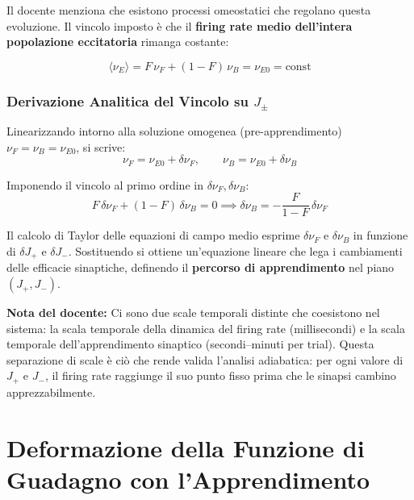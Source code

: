 Il docente menziona che esistono processi omeostatici che regolano questa evoluzione. Il vincolo imposto è che il \textbf{firing rate medio dell'intera popolazione eccitatoria} rimanga costante:

\begin{equation}
\langle \nu_E \rangle = F \, \nu_F + (1-F) \, \nu_B = \nu_{E0} = \text{const}
\end{equation}

\subsubsection{Derivazione Analitica del Vincolo su $J_\pm$}

Linearizzando intorno alla soluzione omogenea (pre-apprendimento) $\nu_F = \nu_B = \nu_{E0}$, si scrive:
\begin{equation}
\nu_F = \nu_{E0} + \delta\nu_F, \qquad \nu_B = \nu_{E0} + \delta\nu_B
\end{equation}

Imponendo il vincolo al primo ordine in $\delta\nu_F, \delta\nu_B$:
\begin{equation}
F \, \delta\nu_F + (1-F) \, \delta\nu_B = 0 \implies \delta\nu_B = -\frac{F}{1-F}\,\delta\nu_F
\end{equation}

Il calcolo di Taylor delle equazioni di campo medio esprime $\delta\nu_F$ e $\delta\nu_B$ in funzione di $\delta J_+$ e $\delta J_-$. Sostituendo si ottiene un'equazione lineare che lega i cambiamenti delle efficacie sinaptiche, definendo il \textbf{percorso di apprendimento} nel piano $(J_+, J_-)$.

\begin{tcolorbox}[colback=gray!5, colframe=gray!40, arc=2mm, boxrule=0.5pt]
\textbf{Nota del docente:} Ci sono due scale temporali distinte che coesistono nel sistema: la scala temporale della dinamica del firing rate (millisecondi) e la scala temporale dell'apprendimento sinaptico (secondi–minuti per trial). Questa separazione di scale è ciò che rende valida l'analisi adiabatica: per ogni valore di $J_+$ e $J_-$, il firing rate raggiunge il suo punto fisso prima che le sinapsi cambino apprezzabilmente.
\end{tcolorbox}


\section{Deformazione della Funzione di Guadagno con l'Apprendimento}

